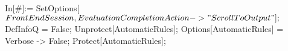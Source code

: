 In[#]:= SetOptions[$FrontEndSession, EvaluationCompletionAction -> "ScrollToOutput"]; $DefInfoQ = False; Unprotect[AutomaticRules]; Options[AutomaticRules] = {Verbose -> False}; Protect[AutomaticRules]; 